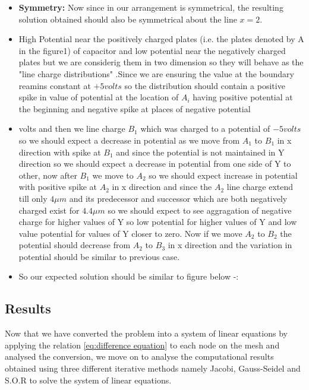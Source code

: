 \begin{itemize}
    \item \textbf{Symmetry: } Now since in our arrangement is symmetrical, the resulting solution obtained should also be symmetrical about the line $x = 2$. 
    \item High Potential near the positively charged plates (i.e. the plates denoted by A  in the figure1) of capacitor and low potential near the negatively charged plates but we are considerig them in two dimension so they will behave as the "line charge distributions" .Since we are ensuring the value at the boundary reamins constant at $ +5 volts $ so the distribution should contain a positive spike in value of potential at the location of $A_i$  having positive potential at the beginning and negative spike at places of negative potential
    \item   volts and then we line charge $ B_1$ which was charged to a potential of $ -5 volts $ so we should expect a decrease in potential as we move from $ A_1 $ to $ B_1 $ in x direction with spike at $ B_1 $ and since the potential is not maintained in Y direction so we should expect a decrease in potential from one side of Y to other, now after $ B_1 $ we move to $ A_2 $ so we should expect increase in potential with positive spike at $ A_2 $ in x direction and since the $ A_2 $ line charge extend till only $ 4 \mu m $ and its predecessor and successor which are both negatively charged exist for $ 4.4 \mu m $ so we should expect to see aggragation of negative charge for higher values of Y so low potential for higher values of Y and low value potential for values of Y closer to zero. Now if we move $ A_2 $ to $ B_2 $ the potential should decrease from $ A_2 $ to $ B_3 $ in x direction and the variation in potential should be similar to previous case.
    \item So our expected solution should be similar to figure below -:     
\end{itemize}

\subsection{Results}
Now that we have converted the problem into a system of linear equations by applying the relation \ref{eq:difference equation} to each node on the mesh and analysed the conversion, we move on to analyse the computational results obtained using three different iterative methods namely Jacobi, Gauss-Seidel and S.O.R to solve the system of linear equations.


